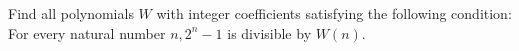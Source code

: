 Find all polynomials $W$ with integer coefficients satisfying the following condition: For every natural number $n, 2^n - 1$ is divisible by $W(n).$